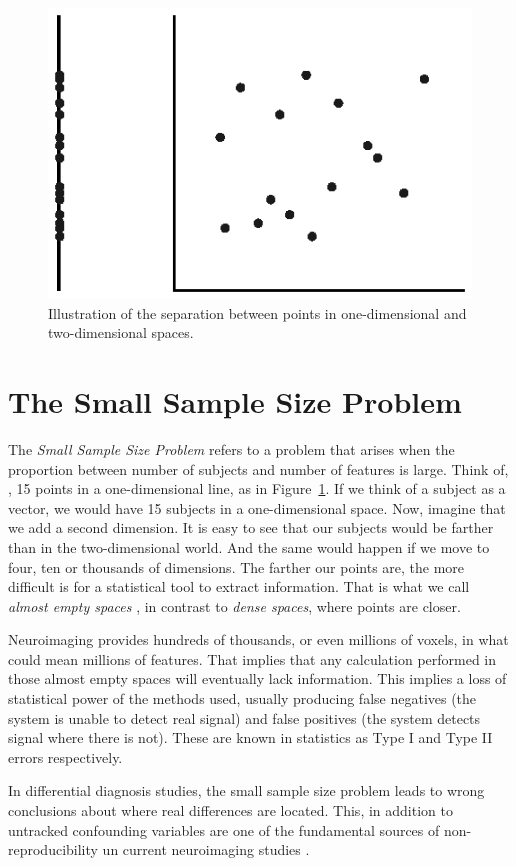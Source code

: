 \begin{figure}
\centering
\includegraphics[width=0.6\linewidth]{Graphics/ch1/smallsample}
\caption[Illustration of one and two-dimensional spaces.]{Illustration of the separation between points in one-dimensional and two-dimensional spaces.}
\label{fig:smallsample}
\end{figure}


\section{The Small Sample Size Problem}\label{sec:smallsamplesize}
The \textit{Small Sample Size Problem} refers to a problem that arises when the proportion between number of subjects and number of features is large. Think of, \eg, 15 points in a one-dimensional line, as in Figure~\ref{fig:smallsample}. If we think of a subject as a vector, we would have 15 subjects in a one-dimensional space. Now, imagine that we add a second dimension. It is easy to see that our subjects would be farther than in the two-dimensional world. And the same would happen if we move to four, ten or thousands of dimensions. The farther our points are, the more difficult is for a statistical tool to extract information. That is what we call \textit{almost empty spaces} \cite{Duin2000,Stoeckel04}, in contrast to \textit{dense spaces}, where points are closer. 

Neuroimaging provides hundreds of thousands, or even millions of voxels, in what could mean millions of features. That implies that any calculation performed in those almost empty spaces will eventually lack information. This implies a loss of statistical power of the methods used, usually producing false negatives (the system is unable to detect real signal) and false positives (the system detects signal where there is not). These are known in statistics as Type I and Type II errors respectively. 

In differential diagnosis studies, the small sample size problem leads to wrong conclusions about where real differences are located. This, in addition to untracked confounding variables are one of the fundamental sources of non-re\-pro\-du\-ci\-bi\-li\-ty un current neuroimaging studies \cite{Button2013}. 

